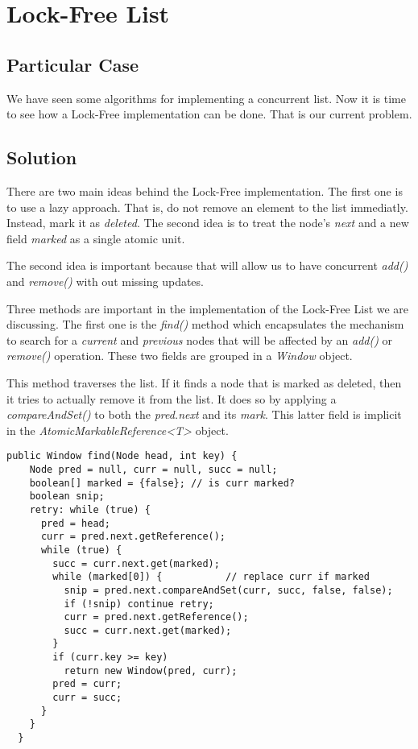 \section{\textbf{Lock-Free List}}
\subsection{Particular Case}
\par
We have seen some algorithms for implementing a concurrent list. Now it is time
to see how a Lock-Free implementation can be done. That is our current problem.
\par
\subsection{Solution}
\par
There are two main ideas behind the Lock-Free implementation. The first one is
to use a lazy approach. That is, do not remove an element to the list
immediatly. Instead, mark it as \textit{deleted}. The second idea is to treat the node's
\textit{next} and a new field \textit{marked} as a single atomic unit. 
\par
The second idea is important because that will allow us to have concurrent
\textit{add()} and \textit{remove()} with out missing updates.
\par
Three methods are important in the implementation of the Lock-Free List we are
discussing. The first one is the \textit{find()} method which encapsulates the
mechanism to search for a \textit{current} and \textit{previous} nodes that will
be affected by an \textit{add()} or \textit{remove()} operation. These two
fields are grouped in a \textit{Window} object.
\par
This method traverses the list. If it finds a node that is marked as deleted,
then it tries to actually remove it from the list. It does so by applying a
\textit{compareAndSet()} to both the \textit{pred.next} and its \textit{mark}.
This latter field is implicit in the \textit{AtomicMarkableReference<T>} object.
\par
\hfill
\begin{lstlisting}[style=numbers]
  public Window find(Node head, int key) {
    Node pred = null, curr = null, succ = null;
    boolean[] marked = {false}; // is curr marked?
    boolean snip;
    retry: while (true) {
      pred = head;
      curr = pred.next.getReference();
      while (true) {
        succ = curr.next.get(marked); 
        while (marked[0]) {           // replace curr if marked
          snip = pred.next.compareAndSet(curr, succ, false, false);
          if (!snip) continue retry;
          curr = pred.next.getReference();
          succ = curr.next.get(marked);
        }
        if (curr.key >= key)
          return new Window(pred, curr);
        pred = curr;
        curr = succ;
      }
    }
  }
\end{lstlisting}
